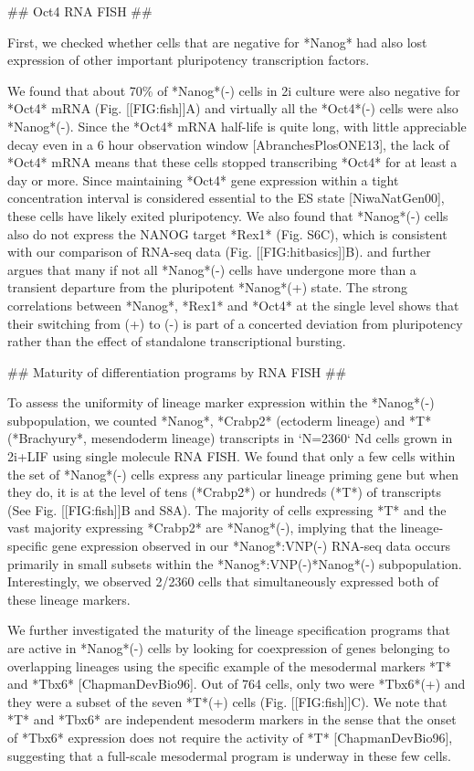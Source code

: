 \documentclass[aps,prl,twocolumn,superscriptaddress]{revtex4}
\begin{document}
## Oct4 RNA FISH ##

First, we checked whether cells that are negative for *Nanog* had also lost expression of other important pluripotency transcription factors. 

We found that about 70\% of *Nanog*(-) cells in 2i culture were also negative for *Oct4* mRNA (Fig. [[FIG:fish]]A) and virtually all the *Oct4*(-) cells were also *Nanog*(-). Since the *Oct4* mRNA half-life is quite long, with little appreciable decay even in a 6 hour observation window [AbranchesPlosONE13], the lack of *Oct4* mRNA means that these cells stopped transcribing *Oct4* for at least a day or more. Since maintaining *Oct4* gene expression within a tight concentration interval is considered essential to the ES state [NiwaNatGen00], these cells have likely exited pluripotency. We also found that *Nanog*(-) cells also do not express the NANOG target *Rex1* (Fig. S6C), which is consistent with our comparison of RNA-seq data (Fig. [[FIG:hitbasics]]B). and further argues that many if not all *Nanog*(-) cells have undergone more than a transient departure from the pluripotent *Nanog*(+) state. The strong correlations between *Nanog*, *Rex1* and *Oct4* at the single level shows that their switching from (+) to (-) is part of a concerted deviation from pluripotency rather than the effect of standalone transcriptional bursting. 


## Maturity of differentiation programs by RNA FISH ##

To assess the uniformity of lineage marker expression within the *Nanog*(-) subpopulation, we counted *Nanog*, *Crabp2* (ectoderm lineage) and *T* (*Brachyury*, mesendoderm lineage) transcripts in `N=2360` Nd cells grown in 2i+LIF using single molecule RNA FISH. We found that only a few cells within the set of *Nanog*(-) cells express any particular lineage priming gene but when they do, it is at the level of tens (*Crabp2*) or hundreds (*T*) of transcripts (See Fig. [[FIG:fish]]B and S8A). The majority of cells expressing *T* and the vast majority expressing *Crabp2* are *Nanog*(-), implying that the lineage-specific gene expression observed in our *Nanog*:VNP(-) RNA-seq data occurs primarily in small subsets within the *Nanog*:VNP(-)*Nanog*(-) subpopulation. Interestingly, we observed 2/2360 cells that simultaneously expressed both of these lineage markers.


We further investigated the maturity of the lineage specification programs that are active in *Nanog*(-) cells by looking for coexpression of genes belonging to overlapping lineages using the specific example of the mesodermal markers *T* and *Tbx6* [ChapmanDevBio96]. Out of 764 cells, only two were *Tbx6*(+) and they were a subset of the seven *T*(+) cells (Fig. [[FIG:fish]]C). We note that *T* and *Tbx6* are independent mesoderm markers in the sense that the onset of *Tbx6* expression does not require the activity of *T* [ChapmanDevBio96], suggesting that a full-scale mesodermal program is underway in these few cells. 
\end{document}
